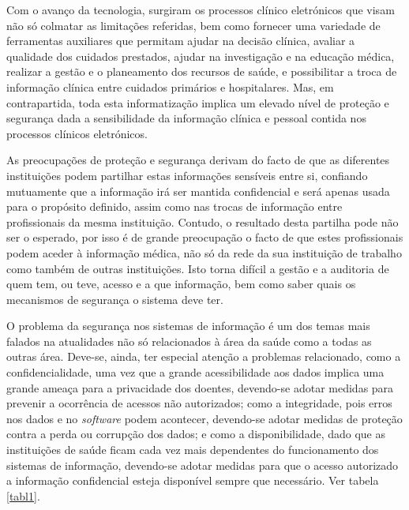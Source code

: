 \documentclass[conference]{IEEEtran}
\begin{document}
Com o avanço da tecnologia, surgiram os processos clínico eletrónicos que visam não só colmatar as limitações referidas, bem como fornecer uma variedade de ferramentas auxiliares que permitam ajudar na decisão clínica, avaliar a qualidade dos cuidados prestados, ajudar na investigação e na educação médica, realizar a gestão e o planeamento dos recursos de saúde, e possibilitar a troca de informação clínica entre cuidados primários e hospitalares. Mas, em contrapartida, toda esta informatização implica um elevado nível de proteção e segurança dada a sensibilidade da informação clínica e pessoal contida nos processos clínicos eletrónicos.

As preocupações de proteção e segurança derivam do facto de que as diferentes instituições podem partilhar estas informações sensíveis entre si, confiando mutuamente que a informação irá ser mantida confidencial e será apenas usada para o propósito definido, assim como nas trocas de informação entre profissionais da mesma instituição. Contudo, o resultado desta partilha pode não ser o esperado, por isso é de grande preocupação o facto de que estes profissionais podem aceder à informação médica, não só da rede da sua instituição de trabalho como também de outras instituições. Isto torna difícil a gestão e a auditoria de quem tem, ou teve, acesso e a que informação, bem como saber quais os mecanismos de segurança o sistema deve ter.

O problema da segurança nos sistemas de informação é um dos temas mais falados na atualidades não só relacionados à área da saúde como a todas as outras área. Deve-se, ainda, ter especial atenção a problemas relacionado, como a confidencialidade, uma vez que a grande acessibilidade aos dados implica uma grande ameaça para a privacidade dos doentes, devendo-se adotar medidas para prevenir a ocorrência de acessos não autorizados; como a integridade, pois erros nos dados e no \textit{software} podem acontecer, devendo-se adotar medidas de proteção contra a perda ou corrupção dos dados; e como a disponibilidade, dado que as instituições de saúde ficam cada vez mais dependentes do funcionamento dos sistemas de informação, devendo-se adotar medidas para que o acesso autorizado a informação confidencial esteja disponível sempre que necessário. Ver tabela \ref{tabl1}.
\end{document}
